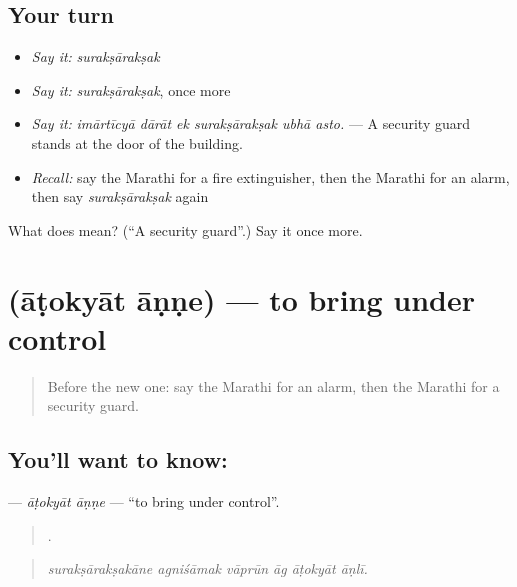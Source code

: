 \subsection*{Your turn}
\begin{itemize}
\raggedright
  \item \emph{Say it:} \emph{surakṣārakṣak}
  \item \emph{Say it:} \emph{surakṣārakṣak}, once more
  \item \emph{Say it:} \emph{imārtīcyā dārāt ek surakṣārakṣak ubhā asto.} — A security guard stands at the door of the building.
  \item \emph{Recall:} say the Marathi for a fire extinguisher, then the Marathi for an alarm, then say \emph{surakṣārakṣak} again
\end{itemize}

\begin{tcolorbox}[breakable,colback=teal!4,colframe=teal!35!black,title={Before you move on}]
What does  mean? (\textquotedblleft{}A security guard\textquotedblright{}.) Say it once more.
\end{tcolorbox}
\section[\texorpdfstring{\mr{आटोक्यात} \mr{आणणे} (āṭokyāt āṇṇe)}{आटोक्यात आणणे (āṭokyāt āṇṇe)}]{  (āṭokyāt āṇṇe) — to bring under control}

\label{lesson:MR-C547-atokyat-anne}



\begin{quote}
Before the new one: say the Marathi for an alarm, then the Marathi for a security guard.
\end{quote}

\subsection*{You'll want to know:  }
\textbf{ } — \emph{āṭokyāt āṇṇe} — \textquotedblleft{}to bring under control\textquotedblright{}.

\begin{quote}
     .
\end{quote}

\begin{quote}
\emph{surakṣārakṣakāne agniśāmak vāprūn āg āṭokyāt āṇlī.}
\end{quote}

